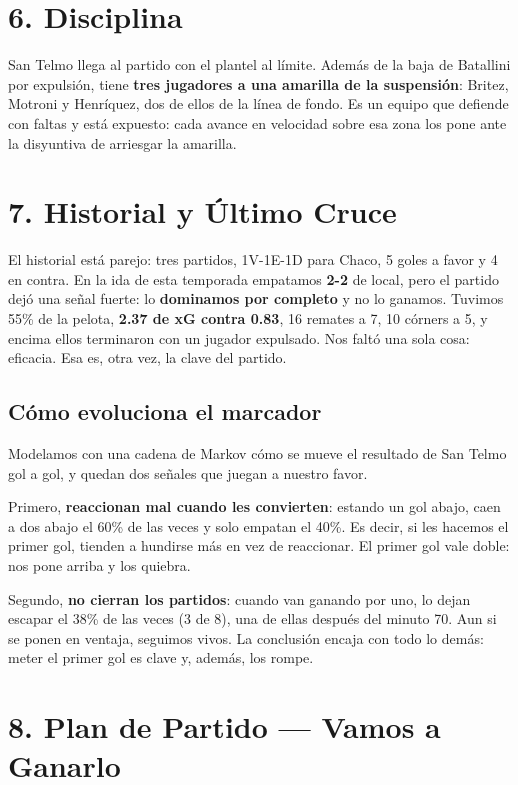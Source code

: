 \documentclass[11pt, a4paper]{article}
\newcommand{\mR}[1]{{\setlength{\fboxsep}{1.5pt}\colorbox{markred}{\textbf{#1}}}}
\newcommand{\mG}[1]{{\setlength{\fboxsep}{1.5pt}\colorbox{markgreen}{\textbf{#1}}}}
\newcommand{\mA}[1]{{\setlength{\fboxsep}{1.5pt}\colorbox{markamber}{\textbf{#1}}}}
\begin{document}
\section*{6. Disciplina}

San Telmo llega al partido con el plantel al límite. Además de la baja de Batallini por expulsión, tiene \mR{tres jugadores a una amarilla de la suspensión}: Britez, Motroni y Henríquez, dos de ellos de la línea de fondo. Es un equipo que defiende con faltas y está expuesto: cada avance en velocidad sobre esa zona los pone ante la disyuntiva de arriesgar la amarilla.

\section*{7. Historial y Último Cruce}

El historial está parejo: tres partidos, 1V-1E-1D para Chaco, 5 goles a favor y 4 en contra. En la ida de esta temporada empatamos \mA{2-2} de local, pero el partido dejó una señal fuerte: lo \mG{dominamos por completo} y no lo ganamos. Tuvimos 55\% de la pelota, \mG{2.37 de xG contra 0.83}, 16 remates a 7, 10 córners a 5, y encima ellos terminaron con un jugador expulsado. Nos faltó una sola cosa: eficacia. Esa es, otra vez, la clave del partido.

\subsection*{Cómo evoluciona el marcador}

Modelamos con una cadena de Markov cómo se mueve el resultado de San Telmo gol a gol, y quedan dos señales que juegan a nuestro favor.

Primero, \mR{reaccionan mal cuando les convierten}: estando un gol abajo, caen a dos abajo el 60\% de las veces y solo empatan el 40\%. Es decir, si les hacemos el primer gol, tienden a hundirse más en vez de reaccionar. El primer gol vale doble: nos pone arriba y los quiebra.

Segundo, \mR{no cierran los partidos}: cuando van ganando por uno, lo dejan escapar el 38\% de las veces (3 de 8), una de ellas después del minuto 70. Aun si se ponen en ventaja, seguimos vivos. La conclusión encaja con todo lo demás: meter el primer gol es clave y, además, los rompe.

\section*{8. Plan de Partido — Vamos a Ganarlo}
\end{document}
